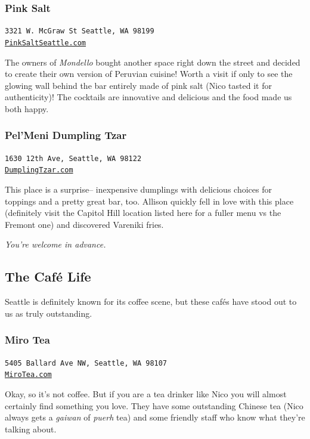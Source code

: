 \documentclass[12pt]{article}
\begin{document}
\newpage
\subsubsection{Pink Salt}
\begin{center}
    \texttt{3321 W. McGraw St Seattle, WA 98199\\\href{https://pinksaltseattle.com/}{PinkSaltSeattle.com}}
\end{center}
The owners of \textit{Mondello} bought another space right down the street and decided to create 
their own version of Peruvian cuisine! Worth a visit if only to see the glowing wall behind the bar
entirely made of pink salt (Nico tasted it for authenticity)! The cocktails are innovative and delicious 
and the food made us both happy.

\subsubsection{Pel'Meni Dumpling Tzar}
\begin{center}
    \texttt{1630 12th Ave, Seattle, WA 98122\\\href{http://dumplingtzar.com/}{DumplingTzar.com}}
\end{center}
This place is a surprise-- inexpensive dumplings with delicious choices for toppings and a pretty 
great bar, too. Allison quickly fell in love with this place (definitely visit the Capitol Hill location 
listed here for a fuller menu vs the Fremont one) and discovered Vareniki fries. 
\begin{center}
    \textit{You're welcome in advance.}    
\end{center}


\newpage
\noindent\hrulefill
\subsection{The Caf\'e Life}
\label{subsec-cafe}
Seattle is definitely known for its coffee scene, but these caf\'es have stood out to us as truly outstanding.
\subsubsection{Miro Tea}
\begin{center}
    \texttt{5405 Ballard Ave NW, Seattle, WA 98107\\\href{http://mirotea.com/}{MiroTea.com}}
\end{center}

Okay, so it's not coffee. But if you are a tea drinker like Nico you will almost certainly
find something you love. They have some outstanding Chinese tea (Nico always gets a \textit{gaiwan} of \textit{puerh} tea)
and some friendly staff who know what they're talking about.
\end{document}

